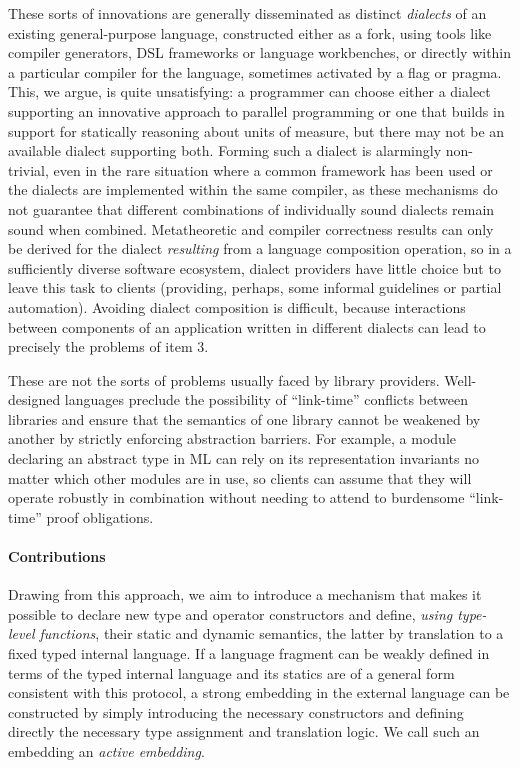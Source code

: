 \documentclass[9pt,preprint]{sigplanconf}
\begin{document}
These sorts of innovations are generally disseminated as distinct \emph{dialects} of an existing general-purpose language, constructed either as a fork, using tools like compiler generators, DSL frame\-works or  language workbenches, or directly within a particular compiler for the language, sometimes activated by a flag or pragma. This, we argue, is quite unsatisfying: a programmer can choose either a dialect supporting an innovative approach to parallel programming or one that builds in support for statically reasoning about units of measure, but there may not be an available dialect supporting both. Forming such a dialect is alarmingly non-trivial, even in the rare situation where a common framework has been used or the dialects are implemented within the same compiler, as these mechanisms do not guarantee that different combinations of individually sound dialects remain sound when combined. Metatheoretic and compiler correctness results can only be derived for the dialect \emph{resulting} from a language   composition operation, so in a sufficiently diverse software ecosystem, dialect providers have little choice but to leave this task to clients (providing, perhaps, some informal guidelines or partial automation). Avoiding dialect composition is difficult, because interactions between components of an application written in different dialects can lead to precisely the problems of item 3.%

These are not the sorts of problems usually faced by library providers. Well-designed languages preclude the  possibility of ``link-time'' conflicts between libraries and ensure that the semantics of one library  cannot be weakened by another by strictly enforcing abstraction barriers. For example, a module declaring an abstract type in ML can rely on its representation invariants no matter which other modules are in use, so clients can assume that they will operate robustly in combination without needing to attend to burdensome ``link-time'' proof obligations. 

\paragraph{Contributions}
Drawing from this approach, we aim to introduce a mechanism that makes it possible to declare new type and operator constructors and define, \emph{using type-level functions}, their static and dynamic semantics, the latter by translation to a fixed typed internal language. If a language fragment can be weakly defined in terms of the typed internal language and its statics are of a general form consistent with this protocol, a  strong embedding in the external language can be constructed by simply introducing the necessary constructors and defining directly the necessary type assignment and translation logic. We call such an embedding an \emph{active embedding}.
\end{document}
